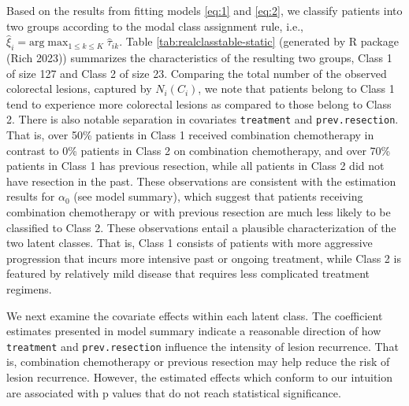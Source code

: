 Based on the results from fitting models \eqref{eq:1} and \eqref{eq:2}, we classify patients into two groups according to the modal class assignment rule, i.e., \(\hat{\xi} _i = \text{arg} \max _{1 \le k \le K} \hat{\tau} _{ik}\). Table \ref{tab:realclasstable-static} (generated by R package  (Rich 2023)) summarizes the characteristics of the resulting two groups, Class 1 of size 127 and Class 2 of size 23. Comparing the total number of the observed colorectal lesions, captured by \(N_i(C_i)\), we note that patients belong to Class 1 tend to experience more colorectal lesions as compared to those belong to Class 2. There is also notable separation in covariates \texttt{treatment} and \texttt{prev.resection}. That is, over 50\% patients in Class 1 received combination chemotherapy in contrast to 0\% patients in Class 2 on combination chemotherapy, and over 70\% patients in Class 1 has previous resection, while all patients in Class 2 did not have resection in the past. These observations are consistent with the estimation results for \(\alpha_0\) (see model summary), which suggest that patients receiving combination chemotherapy or with previous resection are much less likely to be classified to Class 2. These observations entail a plausible characterization of the two latent classes. That is, Class 1 consists of patients with more aggressive progression that incurs more intensive past or ongoing treatment, while Class 2 is featured by relatively mild disease that requires less complicated treatment regimens.

We next examine the covariate effects within each latent class. The coefficient estimates presented in model summary indicate a reasonable direction of how \texttt{treatment} and \texttt{prev.resection} influence the intensity of lesion recurrence. That is, combination chemotherapy or previous resection may help reduce the risk of lesion recurrence. However, the estimated effects which conform to our intuition are associated with p values that do not reach statistical significance.

